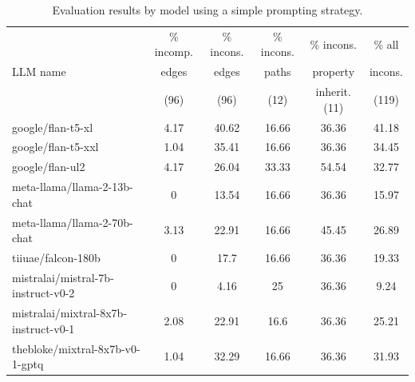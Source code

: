 \documentclass{article} %
\begin{document}
\begin{table}[htbp]
\small
  \centering
  \caption{Evaluation results by model using a simple prompting strategy.}
  \setlength{\tabcolsep}{2pt}
    \begin{tabular}{lccccc}
    \toprule
    \multicolumn{1}{l}{\multirow{3}[1]{*}{LLM name}} & \multicolumn{1}{c}{\% incomp.} & \multicolumn{1}{c}{\% incons.} & \multicolumn{1}{c}{\% incons.} & \multicolumn{1}{c}{\% incons.} & \multicolumn{1}{c}{\% all} \\
          & \multicolumn{1}{c}{edges} & \multicolumn{1}{c}{edges} & \multicolumn{1}{c}{paths} & \multicolumn{1}{c}{property} & \multicolumn{1}{c}{incons.} \\
          & \multicolumn{1}{c}{(96)}      &  (96)     &  (12)     & \multicolumn{1}{c}{inherit. (11)} & \multicolumn{1}{c}{(119)} \\
    \midrule
    google/flan-t5-xl & 4.17  & 40.62 & 16.66 & 36.36 & 41.18 \\
    google/flan-t5-xxl & 1.04  & 35.41 & 16.66 & 36.36 & 34.45 \\
    google/flan-ul2 & 4.17  & 26.04 & 33.33 & 54.54 & 32.77 \\
    meta-llama/llama-2-13b-chat & 0     & 13.54 & 16.66 & 36.36 & 15.97 \\
    meta-llama/llama-2-70b-chat & 3.13  & 22.91 & 16.66 & 45.45 & 26.89 \\
    tiiuae/falcon-180b & 0     & 17.7  & 16.66 & 36.36 & 19.33 \\
    mistralai/mistral-7b-instruct-v0-2 & 0     & 4.16  & 25    & 36.36 & 9.24 \\
    mistralai/mixtral-8x7b-instruct-v0-1 & 2.08  & 22.91 & 16.6  & 36.36 & 25.21 \\
    thebloke/mixtral-8x7b-v0-1-gptq & 1.04  & 32.29 & 16.66 & 36.36 & 31.93 \\
    \bottomrule
    \end{tabular}%
  \label{tab:eval_prompt_naive}%
\end{table}%
\end{document}
